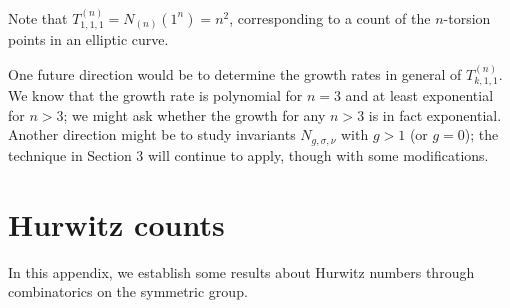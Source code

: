 \documentclass[thesis]{thesis-umich}           %
\theoremstyle{definition}
\begin{document}
  Note that $T_{1,1,1}^{(n)}=N_{(n)}(1^n)=n^2$, corresponding
  to a count of the $n$-torsion points in an elliptic curve.

One future direction would
be to determine the growth rates in general of $T_{k,1,1}^{(n)}$.
We know that the growth rate is polynomial for $n=3$ and at least
exponential for $n>3$; we might ask whether the growth for
any $n>3$ is in fact exponential.
Another direction might be to study invariants $N_{g,\sigma,\nu}$ with
$g>1$ (or $g=0$); the technique in Section 3 will continue
to apply, though with some modifications.


\appendix

\chapter{Hurwitz counts}
\label{appendix:hurwitz}

In this appendix, we establish some results about Hurwitz numbers
through combinatorics on the symmetric group.
\end{document}
